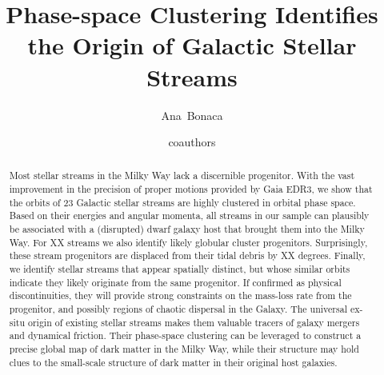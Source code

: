\documentclass[twocolumn]{aastex63}
\begin{document}
\sloppy\sloppypar\raggedbottom\frenchspacing %

\title{Phase-space Clustering Identifies the Origin of Galactic Stellar Streams}


\author[0000-0002-7846-9787]{Ana~Bonaca}

\author{coauthors}



\begin{abstract}\noindent %
Most stellar streams in the Milky Way lack a discernible progenitor.
With the vast improvement in the precision of proper motions provided by Gaia EDR3, we show that the orbits of 23 Galactic stellar streams are highly clustered in orbital phase space.
Based on their energies and angular momenta, all streams in our sample can plausibly be associated with a (disrupted) dwarf galaxy host that brought them into the Milky Way.
For XX streams we also identify likely globular cluster progenitors.
Surprisingly, these stream progenitors are displaced from their tidal debris by XX degrees.
Finally, we identify stellar streams that appear spatially distinct, but whose similar orbits indicate they likely originate from the same progenitor.
If confirmed as physical discontinuities, they will provide strong constraints on the mass-loss rate from the progenitor, and possibly regions of chaotic dispersal in the Galaxy.
The universal ex-situ origin of existing stellar streams makes them valuable tracers of galaxy mergers and dynamical friction.
Their phase-space clustering can be leveraged to construct a precise global map of dark matter in the Milky Way, while their structure may hold clues to the small-scale structure of dark matter in their original host galaxies.
\end{abstract}
\end{document}
